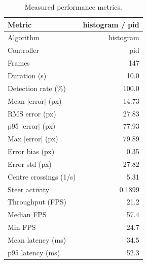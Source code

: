 \begin{table}[htbp]
\centering
\caption{Measured performance metrics.}
\label{tab:results}
\begin{tabular}{lr}
\hline
Metric & histogram / pid \\
\hline
Algorithm & histogram \\
Controller & pid \\
Frames & 147 \\
Duration (s) & 10.0 \\
Detection rate (\%) & 100.0 \\
Mean $|$error$|$ (px) & 14.73 \\
RMS error (px) & 27.83 \\
p95 $|$error$|$ (px) & 77.93 \\
Max $|$error$|$ (px) & 79.89 \\
Error bias (px) & 0.35 \\
Error std (px) & 27.82 \\
Centre crossings (1/s) & 5.31 \\
Steer activity & 0.1899 \\
Throughput (FPS) & 21.2 \\
Median FPS & 57.4 \\
Min FPS & 24.7 \\
Mean latency (ms) & 34.5 \\
p95 latency (ms) & 52.3 \\
\hline
\end{tabular}
\end{table}
